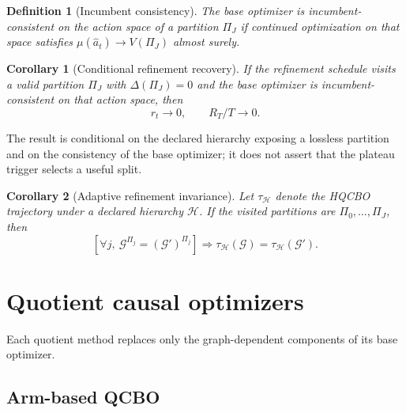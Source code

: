 \documentclass[twoside]{article}
\newtheorem{definition}{Definition}
\newtheorem{corollary}{Corollary}
\newcommand{\Gg}{\mathcal{G}}
\begin{document}
\begin{definition}[Incumbent consistency]
\label{def:consistency}
The base optimizer is incumbent-consistent on the action space of a
partition $\Pi_J$ if continued optimization on that space satisfies
$\mu(\hat a_t)\to V(\Pi_J)$ almost surely.
\end{definition}

\begin{corollary}[Conditional refinement recovery]
\label{cor:recovery}
If the refinement schedule visits a valid partition $\Pi_J$ with
$\Delta(\Pi_J)=0$ and the base optimizer is incumbent-consistent on that
action space, then
\[
 r_t\longrightarrow0,
 \qquad R_T/T\longrightarrow0.
\]
\end{corollary}

The result is conditional on the declared hierarchy exposing a lossless
partition and on the consistency of the base optimizer; it does not assert
that the plateau trigger selects a useful split.

\begin{corollary}[Adaptive refinement invariance]
\label{cor:adaptive-invariance}
Let $\tau_{\mathcal H}$ denote the HQCBO trajectory under a declared
hierarchy $\mathcal H$. If the visited partitions are
$\Pi_0,\ldots,\Pi_J$, then
\[
 \left[\forall j,\ \Gg^{\Pi_j}=(\Gg')^{\Pi_j}\right]
 \Longrightarrow
 \tau_{\mathcal H}(\Gg)=\tau_{\mathcal H}(\Gg').
\]
\end{corollary}

\section{Quotient causal optimizers}
\label{sec:methods}

Each quotient method replaces only the graph-dependent components of its
base optimizer.

\subsection{Arm-based QCBO}
\end{document}
